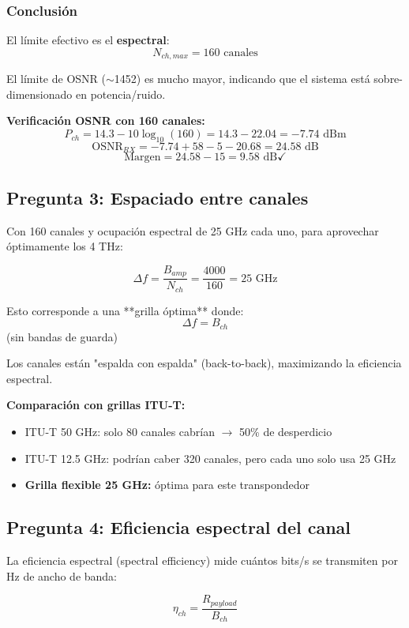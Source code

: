 \documentclass[a4paper,10pt]{article}
\begin{document}
\subsubsection{Conclusión}

El límite efectivo es el \textbf{espectral}:
$$\boxed{N_{ch,max} = 160 \text{ canales}}$$

El límite de OSNR ($\sim$1452) es mucho mayor, indicando que el sistema está sobre-dimensionado en potencia/ruido.

\textbf{Verificación OSNR con 160 canales:}
$$P_{ch} = 14.3 - 10\log_{10}(160) = 14.3 - 22.04 = -7.74 \text{ dBm}$$
$$\text{OSNR}_{RX} = -7.74 + 58 - 5 - 20.68 = 24.58 \text{ dB}$$
$$\text{Margen} = 24.58 - 15 = \boxed{9.58 \text{ dB}} \checkmark$$

\subsection{Pregunta 3: Espaciado entre canales}

Con 160 canales y ocupación espectral de 25 GHz cada uno, para aprovechar óptimamente los 4 THz:

$$\Delta f = \frac{B_{amp}}{N_{ch}} = \frac{4000}{160} = \boxed{25 \text{ GHz}}$$

Esto corresponde a una **grilla óptima** donde:
$$\Delta f = B_{ch}$$ (sin bandas de guarda)

Los canales están "espalda con espalda" (back-to-back), maximizando la eficiencia espectral.

\textbf{Comparación con grillas ITU-T:}
\begin{itemize}
    \item ITU-T 50 GHz: solo 80 canales cabrían $\rightarrow$ 50\% de desperdicio
    \item ITU-T 12.5 GHz: podrían caber 320 canales, pero cada uno solo usa 25 GHz
    \item \textbf{Grilla flexible 25 GHz:} óptima para este transpondedor
\end{itemize}

\subsection{Pregunta 4: Eficiencia espectral del canal}

La eficiencia espectral (spectral efficiency) mide cuántos bits/s se transmiten por Hz de ancho de banda:

$$\eta_{ch} = \frac{R_{payload}}{B_{ch}}$$
\end{document}
